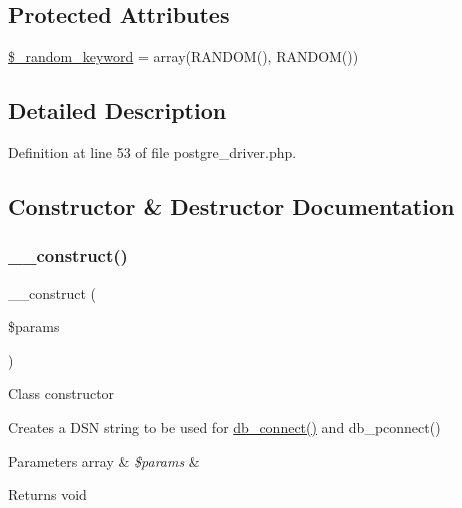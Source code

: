 \subsection*{Protected Attributes}
\begin{DoxyCompactItemize}
\item 
\mbox{\hyperlink{class_c_i___d_b__postgre__driver_a10213aa6e05f6d924d3277bb1d2fea00}{\$\+\_\+random\+\_\+keyword}} = array(\textquotesingle{}R\+A\+N\+D\+OM()\textquotesingle{}, \textquotesingle{}R\+A\+N\+D\+OM()\textquotesingle{})
\end{DoxyCompactItemize}


\subsection{Detailed Description}


Definition at line 53 of file postgre\+\_\+driver.\+php.



\subsection{Constructor \& Destructor Documentation}
\mbox{\label{class_c_i___d_b__postgre__driver_a9162320adff1a1a4afd7f2372f753a3e}} 
\subsubsection{\texorpdfstring{\_\_construct()}{\_\_construct()}}
{\footnotesize\ttfamily \+\_\+\+\_\+construct (\begin{DoxyParamCaption}\item[{}]{\$params }\end{DoxyParamCaption})}

Class constructor

Creates a D\+SN string to be used for \mbox{\hyperlink{class_c_i___d_b__postgre__driver_a52bf595e79e96cc0a7c907a9b45aeb4d}{db\+\_\+connect()}} and db\+\_\+pconnect()


\begin{DoxyParams}[1]{Parameters}
array & {\em \$params} & \\
\hline
\end{DoxyParams}
\begin{DoxyReturn}{Returns}
void 
\end{DoxyReturn}


